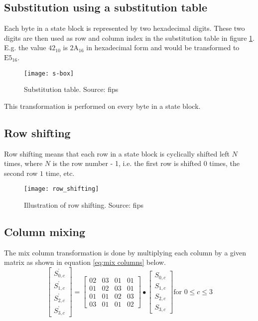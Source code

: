 \documentclass[report.tex]{subfiles}
\begin{document}
\clearpage

\subsection{Substitution using a substitution table}\label{sec:substitution}
Each byte in a state block is represented by two hexadecimal digits. These two digits are then used as row and column index in the substitution table in figure \ref{fig:s-box}. E.g. the value $\textrm{42}_{10}$ is $\textrm{2A}_{16}$ in hexadecimal form and would be transformed to $\textrm{E5}_{16}$.

\begin{figure}[h]
\centering
\texttt{[image: s-box]}
\caption{Substitution table. Source: fips}
\label{fig:s-box}
\end{figure}

This transformation is performed on every byte in a state block.

\subsection{Row shifting}
Row shifting means that each row in a state block is cyclically shifted left $N$ times, where $N$ is the row number - 1, i.e. the first row is shifted $0$ times, the second row $1$ time, etc.

\begin{figure}[h]
\centering
\texttt{[image: row\_shifting]}
\caption{Illustration of row shifting. Source: fips}
\label{fig:row_shifting}
\end{figure}

\subsection{Column mixing}
The mix column transformation is done by multiplying each column by a given matrix as shown in equation \ref{eq:mix columns} below.
\begin{equation}\label{eq:mix columns}
	\begin{bmatrix}
	S_{0,c}^\text{'} \\
	S_{1,c}^\text{'} \\
	S_{2,c}^\text{'} \\
	S_{3,c}^\text{'}
	\end{bmatrix}
	=
	\begin{bmatrix}
	02 & 03 & 01 & 01 \\
	01 & 02 & 03 & 01 \\
	01 & 01 & 02 & 03 \\
	03 & 01 & 01 & 02
	\end{bmatrix}
	\bullet
	\begin{bmatrix}
	S_{0,c} \\
	S_{1,c} \\
	S_{2,c} \\
	S_{3,c}
	\end{bmatrix}
	\text{for }0 \leq c \leq 3
\end{equation}
\end{document}
